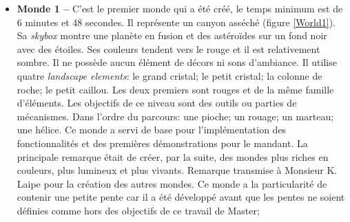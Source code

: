 		\begin{itemize}
			\item \textbf{Monde 1 --} C'est le premier monde qui a été créé, le temps minimum est de 6 minutes et 48 secondes. Il représente un canyon asséché (figure \ref{World1}). Sa \textit{skybox} montre une planète en fusion et des astéroïdes sur un fond noir avec des étoiles. Ses couleurs tendent vers le rouge et il est relativement sombre. Il ne possède aucun élément de décors ni sons d'ambiance. Il utilise quatre \textit{landscape elements}: le grand cristal; le petit cristal; la colonne de roche; le petit caillou. Les deux premiers sont rouges et de la même famille d'éléments. Les objectifs de ce niveau sont des outils ou parties de mécanismes. Dans l'ordre du parcours: une pioche; un rouage; un marteau; une hélice. Ce monde a servi de base pour l'implémentation des fonctionnalités et des premières démonstrations pour le mandant. La principale remarque était de créer, par la suite, des mondes plus riches en couleurs, plus lumineux et plus vivants. Remarque transmise à Monsieur K. Laipe pour la création des autres mondes. Ce monde a la particularité de contenir une petite pente car il a été développé avant que les pentes ne soient définies comme hors des objectifs de ce travail de Master;\medskip		
			
			\begin{minipage}{\linewidth}
				\label{World1}
			\end{minipage}\medskip	%
			

\end{itemize}
